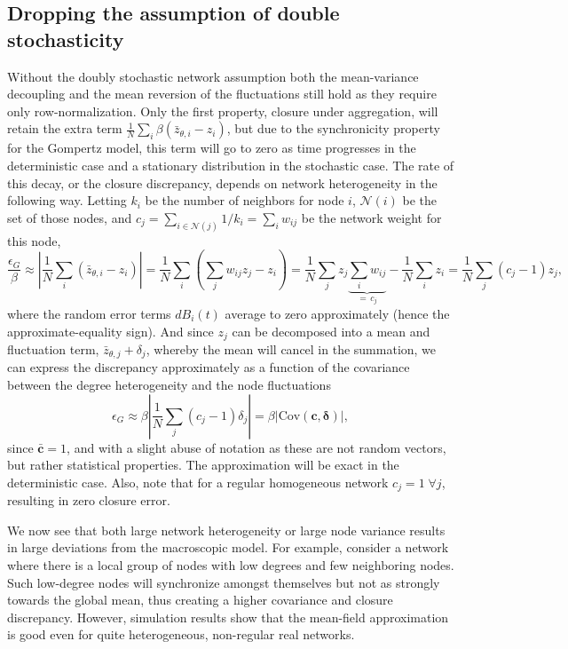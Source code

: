 \documentclass{article}
\begin{document}
\subsection{Dropping the assumption of double stochasticity}
 Without the doubly stochastic network assumption both the mean-variance decoupling and the mean reversion of the fluctuations still hold as they require only row-normalization. Only the first property, closure under aggregation, will retain the extra term $\frac{1}{N}\sum_i\beta (\bar{z}_{\theta,i} - z_i)$, but due to the synchronicity property for the Gompertz model, this term will go to zero as time progresses in the deterministic case and a stationary distribution in the stochastic case. The rate of this decay, or the closure discrepancy, depends on network heterogeneity in the following way. Letting $k_i$ be the number of neighbors for node $i$, $\mathcal{N}(i)$ be the set of those nodes, and $c_j=\sum_{i\in \mathcal{N}(j)}1/k_i=\sum_i w_{ij}$ be the network weight for this node, 
\begin{equation}
  \frac{\epsilon_G}{\beta} \approx \left|\frac{1}{N}\sum_i (\bar{z}_{\theta,i} - z_i)\right| = \frac{1}{N}\sum_i\left(\sum_j w_{ij}z_j - z_i\right) = \frac{1}{N}\sum_j z_j\underbrace{\sum_i w_{ij}}_{=\,c_j} - \frac{1}{N}\sum_i z_i = \frac{1}{N}\sum_j (c_j-1)z_j,
\end{equation}
where the random error terms $dB_i(t)$ average to zero approximately (hence the approximate-equality sign). And since $z_j$ can be decomposed into a mean and fluctuation term, $\bar{z}_{\theta,j} + \delta_j$, whereby the mean will cancel in the summation, we can express the discrepancy approximately as a function of the covariance between the degree heterogeneity and the node fluctuations 
\begin{equation}
  \epsilon_G \approx \beta \left|\frac{1}{N}\sum_j(c_j - 1)\delta_j\right| = \beta|\text{Cov}(\mathbf{c},\boldsymbol{\delta})|,
\end{equation}
since $\bar{\mathbf{c}}=1$, and with a slight abuse of notation as these are not random vectors, but rather statistical properties. The approximation will be exact in the deterministic case. Also, note that for a regular homogeneous network $c_j=1 \; \forall j$, resulting in zero closure error.

We now see that both large network heterogeneity or large node variance results in large deviations from the macroscopic model. For example, consider a network where there is a local group of nodes with low degrees and few neighboring nodes. Such low-degree nodes will synchronize amongst themselves but not as strongly towards the global mean, thus creating a higher covariance and closure discrepancy. However, simulation results show that the mean-field approximation is good even for quite heterogeneous, non-regular real networks.
\end{document}
